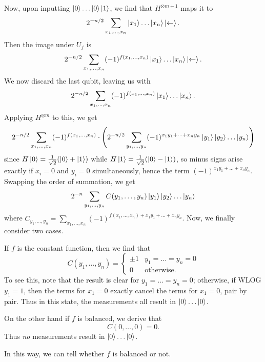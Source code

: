 \begin{problem}
\begin{sol}
		Now, upon inputting $\ket0 \dots \ket0 \ket1$, we find that $H^{\otimes m+1}$ maps it to
		\[ 2^{-n/2} \sum_{x_1, \dots, x_n} \ket{x_1} \dots \ket{x_n} \ket\leftarrow.  \]
		Then the image under $U_f$ is
		\[ 2^{-n/2} \sum_{x_1, \dots, x_n} (-1)^{f(x_1, \dots, x_n)} \ket{x_1} \dots \ket{x_n} \ket\leftarrow.  \]
		We now discard the last qubit, leaving us with
		\[ 2^{-n/2} \sum_{x_1, \dots, x_n} (-1)^{f(x_1, \dots, x_n)} \ket{x_1} \dots \ket{x_n}.  \]
		Applying $H^{\otimes m}$ to this, we get
		\[ 2^{-n/2} \sum_{x_1, \dots, x_n} (-1)^{f(x_1, \dots, x_n)}
			\cdot
			\left(
			2^{-n/2}
			\sum_{y_1, \dots, y_n}
			(-1)^{x_1y_1 + \dots + x_ny_n}
			\ket{y_1} \ket{y_2} \dots \ket{y_n}
			\right)
		\]
		since $H\ket0 = \frac{1}{\sqrt2}(\ket0+\ket1)$
		while $H\ket1 = \frac{1}{\sqrt2}(\ket0-\ket1)$,
		so minus signs arise exactly if $x_i = 0$ and $y_i = 0$ simultaneously,
		hence the term $(-1)^{x_1y_1 + \dots + x_ny_n}$.
		Swapping the order of summation, we get
		\[ 
			2^{-n}
			\sum_{y_1, \dots, y_n}
			C(y_1, \dots, y_n)
			\ket{y_1} \ket{y_2} \dots \ket{y_n}
		\]
		where $C_{y_1, \dots, y_n}  = \sum_{x_1, \dots, x_n} (-1)^{f(x_1, \dots, x_n)+x_1y_1 + \dots + x_ny_n}$.
		Now, we finally consider two cases.
		\begin{itemize}
			\ii If $f$ is the constant function, then we find that
			\[
				C(y_1, \dots, y_n) = 
				\begin{cases}
					\pm 1 &  y_1 = \dots = y_n = 0 \\
					0 & \text{otherwise}.
				\end{cases}
			\]
			To see this, note that the result is clear for $y_1 = \dots = y_n = 0$;
			otherwise, if WLOG $y_1 = 1$, then the terms for $x_1 = 0$ exactly cancel
			the terms for $x_1 = 0$, pair by pair.
			Thus in this state, the measurements all result in $\ket0 \dots \ket0$.

			\ii On the other hand if $f$ is balanced, we derive that
			\[ C(0, \dots, 0) = 0. \]
			Thus \emph{no} measurements result in $\ket 0 \dots \ket 0$.
		\end{itemize}
		In this way, we can tell whether $f$ is balanced or not.
	\end{sol}
\end{problem}

